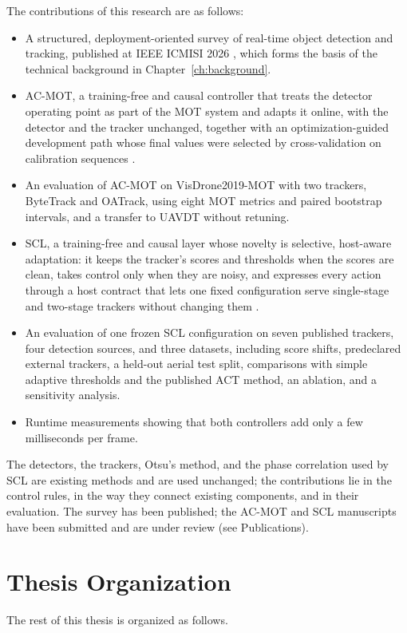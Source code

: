 The contributions of this research are as follows:
\begin{itemize}
\item A structured, deployment-oriented survey of real-time object detection and tracking, published at IEEE ICMISI 2026 \cite{ismail2026realtime}, which forms the basis of the technical background in Chapter~\ref{ch:background}.
\item AC-MOT, a training-free and causal controller that treats the detector operating point as part of the MOT system and adapts it online, with the detector and the tracker unchanged, together with an optimization-guided development path whose final values were selected by cross-validation on calibration sequences \cite{ismail2026acmot}.
\item An evaluation of AC-MOT on VisDrone2019-MOT with two trackers, ByteTrack and OATrack, using eight MOT metrics and paired bootstrap intervals, and a transfer to UAVDT without retuning.
\item SCL, a training-free and causal layer whose novelty is selective, host-aware adaptation: it keeps the tracker's scores and thresholds when the scores are clean, takes control only when they are noisy, and expresses every action through a host contract that lets one fixed configuration serve single-stage and two-stage trackers without changing them \cite{ismail2026scl}.
\item An evaluation of one frozen SCL configuration on seven published trackers, four detection sources, and three datasets, including score shifts, predeclared external trackers, a held-out aerial test split, comparisons with simple adaptive thresholds and the published ACT method, an ablation, and a sensitivity analysis.
\item Runtime measurements showing that both controllers add only a few milliseconds per frame.
\end{itemize}
The detectors, the trackers, Otsu's method, and the phase correlation used by SCL are existing methods and are used unchanged; the contributions lie in the control rules, in the way they connect existing components, and in their evaluation. The survey has been published; the AC-MOT and SCL manuscripts have been submitted and are under review (see Publications).

\section{Thesis Organization}\label{sec:intro-organization}
The rest of this thesis is organized as follows.

